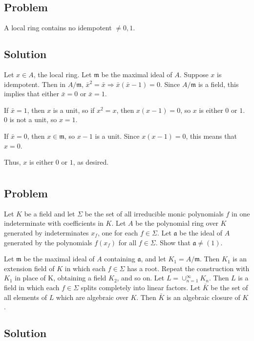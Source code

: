 \documentclass[book,12pt,oneside,openany]{memoir}
\begin{document}
\subsection{Problem}
A local ring contains no idempotent $\neq 0,1$.
\subsection{Solution}
Let $x \in A$, the local ring. Let $\mathfrak{m}$ be the maximal ideal of $A$. Suppose $x$ is idempotent. Then in $A/\mathfrak{m}$, $\bar{x}^2 = \bar{x} \Rightarrow \bar{x} ( \bar{x} - 1) = 0$. Since $A/\mathfrak{m}$ is a field, this implies that either $\bar{x} = 0$ or $\bar{x} = 1$.

If $\bar{x} = 1$, then $x$ is a unit, so if $x^2 = x$, then $x(x - 1) = 0$, so $x$ is either $0$ or $1$. $0$ is not a unit, so $x = 1$.

If $\bar{x} = 0$, then $x \in \mathfrak{m}$, so $x - 1$ is a unit. Since $x(x - 1) = 0$, this means that $x = 0$.

Thus, $x$ is either $0$ or $1$, as desired.


\section{}
\subsection{Problem}
Let $K$ be a field and let $\Sigma$ be the set of all irreducible monic polynomials $f$ in one indeterminate with coefficients in $K$. Let $A$ be the polynomial ring over $K$ generated by indeterminates $x_f$, one for each $f \in \Sigma$. Let $\mathfrak{a}$ be the ideal of $A$ generated by the polynomials $f(x_f)$ for all $f \in \Sigma$. Show that $\mathfrak{a} \neq (1)$.

Let $\mathfrak{m}$ be the maximal ideal of $A$ containing $\mathfrak{a}$, and let $K_1 = A/\mathfrak{m}$. Then $K_1$ is an extension field of $K$ in which each $f \in \Sigma$ has a root. Repeat the construction with $K_1$ in place of K, obtaining a field $K_2$, and so on. Let $L = \cup_{n=1}^{\infty} K_n$. Then $L$ is a field in which each $f \in \Sigma$ splits completely into linear factors. Let $\bar{K}$ be the set of all elements of $L$ which are algebraic over $K$. Then $\bar{K}$ is an algebraic closure of $K$.
\subsection{Solution}
\end{document}
